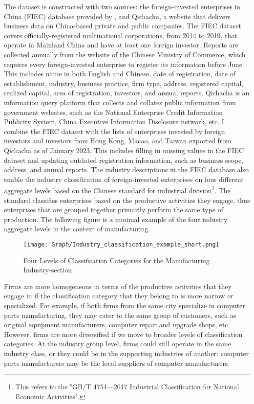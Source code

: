 The dataset is constructed with two sources: the foreign-invested enterprises in China (FIEC) database provided by \cite{vortherms2021political}, and Qichacha, a website that delivers business data on China-based private and public companies. The FIEC dataset covers officially-registered multinational corporations, from 2014 to 2019, that operate in Mainland China and have at least one foreign investor. Reports are collected annually from the website of the Chinese Ministry of Commerce, which requires every foreign-invested enterprise to register its information before June. This includes name in both English and Chinese, date of registration, date of establishment, industry, business practice, firm type, address, registered capital, realized capital, area of registration, investors, and annual reports. Qichacha is an information query platform that collects and collates public information from government websites, such as the National Enterprise Credit Information Publicity System, China Executive Information Disclosure network, etc. I combine the FIEC dataset with the lists of enterprises invested by foreign investors and investors from Hong Kong, Macao, and Taiwan exported from Qichacha as of January 2023. This includes filling in missing values in the FIEC dataset and updating outdated registration information, such as business scope, address, and annual reports. The industry descriptions in the FIEC database also enable the industry classification of foreign-invested enterprises on four different aggregate levels based on the Chinese standard for industrial division\footnote{This refers to the "GB/T 4754—2017 Industrial Classification for National Economic Activities".}. The standard classifies enterprises based on the productive activities they engage, thus enterprises that are grouped together primarily perform the same type of production. The following figure is a minimal example of the four industry aggregate levels in the context of manufacturing.

\begin{figure}[!htbp]
  \centering
  \texttt{[image: Graph/Industry\_classification\_example\_short.png]}
  \caption{Four Levels of Classification Categories for the Manufacturing Industry-section}
\end{figure}

Firms are more homogeneous in terms of the productive activities that they engage in if the classification category that they belong to is more narrow or specialized. For example, if both firms from the same city specialize in computer parts manufacturing, they may cater to the same group of customers, such as original equipment manufacturers, computer repair and upgrade shops, etc. However, firms are more diversified if we move to broader levels of classification categories. At the industry group level, firms could still operate in the same industry class, or they could be in the supporting industries of another: computer parts manufacturers may be the local suppliers of computer manufacturers.

